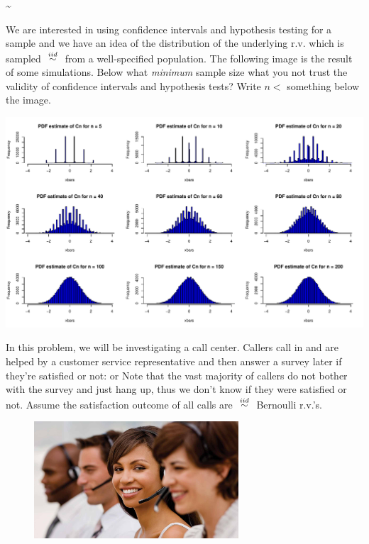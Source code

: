 \documentclass[12pt]{article}
\begin{document}
\beqn
{} \sim \quad\quad\quad\quad\quad\quad\quad\quad\quad\quad\quad\quad
\eeqn {}

 We are interested in using confidence intervals and hypothesis testing for a sample and we have an idea of the distribution of the underlying r.v. which is sampled $\iid$ from a well-specified population. The following image is the result of some simulations. Below what \textit{minimum} sample size what you not trust the validity of confidence intervals and hypothesis tests? Write $n < $ something below the image.

\begin{changemargin}{-0.6in}{0in}
\includegraphics[width=7in]{clt.pdf}
\end{changemargin}


\eenum
\pagebreak

\problem In this problem, we will be investigating a call center. Callers call in and are helped by a customer service representative and then answer a survey later if they're satisfied or not:  or  Note that the vast majority of callers do not bother with the survey and just hang up, thus we don't know if they were satisfied or not. Assume the satisfaction outcome of all calls are $\iid$ Bernoulli r.v.'s.

\begin{figure}[h]
\begin{center}
\includegraphics[width=3in]{callcenter.jpg}
\end{center}
\end{figure}
\end{document}
